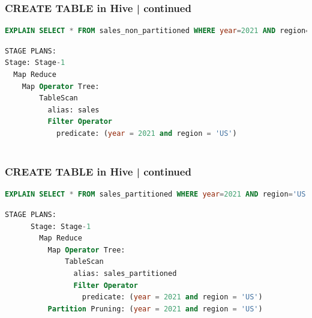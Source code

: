 \begin{frame}[fragile]
	\frametitle{CREATE TABLE in Hive | continued}
	\vspace{-0.6cm}
	\begin{tcolorbox}[colback=white,colframe=black,title= Part 8: Table Partitions]
	\small
	\vspace{-0.3cm}
\begin{lstlisting}[caption={Explain Plan Command for Non-Partitioned Table },language=SQL]
EXPLAIN SELECT * FROM sales_non_partitioned WHERE year=2021 AND region='US';
\end{lstlisting}
\vspace{-0.5cm}
\begin{lstlisting}[caption={Explain Plan Command for Non-Partitioned Table },language=SQL]
STAGE PLANS:
Stage: Stage-1
  Map Reduce
    Map Operator Tree:
        TableScan
          alias: sales
          Filter Operator
            predicate: (year = 2021 and region = 'US')
 
\end{lstlisting}
\end{tcolorbox}
	
\end{frame}
\begin{frame}[fragile]
	\frametitle{CREATE TABLE in Hive | continued}
	\vspace{-0.6cm}
	\begin{tcolorbox}[colback=white,colframe=black,title= Part 8: Table Partitions]
	\small
	\vspace{-0.3cm}
\begin{lstlisting}[caption={Explain Plan Command for Partitioned Table },language=SQL]
EXPLAIN SELECT * FROM sales_partitioned WHERE year=2021 AND region='US';
\end{lstlisting}
	\vspace{-0.5cm}
\begin{lstlisting}[caption={Explain Plan Command for Partitioned Table },language=SQL]
    STAGE PLANS:
      Stage: Stage-1
        Map Reduce
          Map Operator Tree:
              TableScan
                alias: sales_partitioned
                Filter Operator
                  predicate: (year = 2021 and region = 'US')
          Partition Pruning: (year = 2021 and region = 'US')
\end{lstlisting}
\end{tcolorbox}
	
\end{frame}
